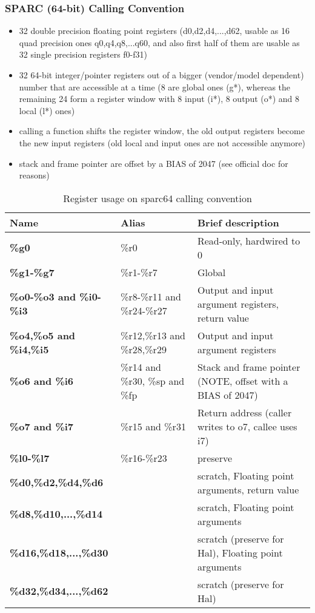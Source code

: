 \subsubsection{SPARC (64-bit) Calling Convention}

\begin{itemize}
\item 32 double precision floating point registers (d0,d2,d4,...,d62, usable as 16 quad precision ones q0,q4,q8,...q60, and also first half of them are usable as 32 single precision registers f0-f31)
\item 32 64-bit integer/pointer registers out of a bigger (vendor/model dependent) number that are accessible at a time (8 are global ones (g*), whereas the remaining 24 form a register window with 8 input (i*), 8 output (o*) and 8 local (l*) ones)
\item calling a function shifts the register window, the old output registers become the new input registers (old local and input ones are not accessible anymore)
\item stack and frame pointer are offset by a BIAS of 2047 (see official doc for reasons)
\end{itemize}

\begin{table}[h]
\begin{tabular*}{0.95\textwidth}{lll}
Name                          & Alias                          & Brief description\\
\hline
{\bf \%g0}                    & \%r0                           & Read-only, hardwired to 0 \\
{\bf \%g1-\%g7}               & \%r1-\%r7                      & Global \\
{\bf \%o0-\%o3 and \%i0-\%i3} & \%r8-\%r11 and \%r24-\%r27     & Output and input argument registers, return value \\
{\bf \%o4,\%o5 and \%i4,\%i5} & \%r12,\%r13 and \%r28,\%r29    & Output and input argument registers \\
{\bf \%o6 and \%i6}           & \%r14 and \%r30, \%sp and \%fp & Stack and frame pointer (NOTE, offset with a BIAS of 2047) \\
{\bf \%o7 and \%i7}           & \%r15 and \%r31                & Return address (caller writes to o7, callee uses i7) \\
{\bf \%l0-\%l7}               & \%r16-\%r23                    & preserve \\
{\bf \%d0,\%d2,\%d4,\%d6}     &                                & scratch, Floating point arguments, return value \\
{\bf \%d8,\%d10,...,\%d14}    &                                & scratch, Floating point arguments \\
{\bf \%d16,\%d18,...,\%d30}   &                                & scratch (preserve for Hal), Floating point arguments \\
{\bf \%d32,\%d34,...,\%d62}   &                                & scratch (preserve for Hal) \\
\end{tabular*}
\caption{Register usage on sparc64 calling convention}
\end{table}

